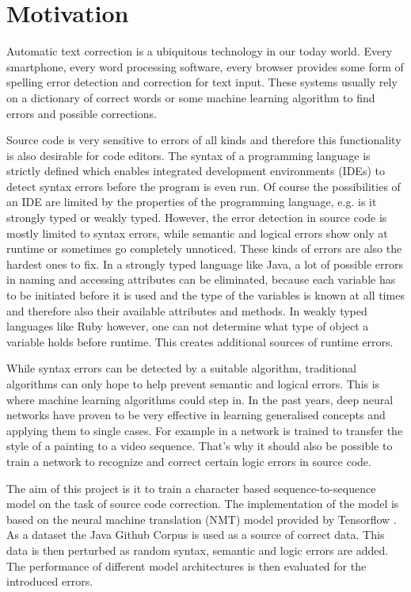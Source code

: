 \section{Motivation}
Automatic text correction is a ubiquitous technology in our today world. Every smartphone, every word processing software, every browser provides some form of spelling error detection and correction for text input. These systems usually rely on a dictionary of correct words \cite{dictionary_correction, digram_correction} or some machine learning algorithm \cite{seq2seq_on_text_correction} to find errors and possible corrections.

Source code is very sensitive to errors of all kinds and therefore this functionality is also desirable for code editors. The syntax of a programming language is strictly defined which enables integrated development environments (IDEs) to detect syntax errors before the program is even run. Of course the possibilities of an IDE are limited by the properties of the programming language, e.g. is it strongly typed or weakly typed. However, the error detection in source code is mostly limited to syntax errors, while semantic and logical errors show only at runtime or sometimes go completely unnoticed. These kinds of errors are also the hardest ones to fix. In a strongly typed language like Java, a lot of possible errors in naming and accessing attributes can be eliminated, because each variable has to be initiated before it is used and the type of the variables is known at all times and therefore also their available attributes and methods. In weakly typed languages like Ruby however, one can not determine what type of object a variable holds before runtime. This creates additional sources of runtime errors.

While syntax errors can be detected by a suitable algorithm, traditional algorithms can only hope to help prevent semantic and logical errors. This is where machine learning algorithms could step in. In the past years, deep neural networks have proven to be very effective in learning generalised concepts and applying them to single cases. For example in \cite{style_transfer} a network is trained to transfer the style of a painting to a video sequence. That's why it should also be possible to train a network to recognize and correct certain logic errors in source code.

The aim of this project is it to train a character based sequence-to-sequence model on the task of source code correction. The implementation of the model is based on the neural machine translation (NMT) model provided by Tensorflow \cite{seq2seq_tutorial}. As a dataset the Java Github Corpus \cite{java_dataset} is used as a source of correct data. This data is then perturbed as random syntax, semantic and logic errors are added. The performance of different model architectures is then evaluated for the introduced errors.

